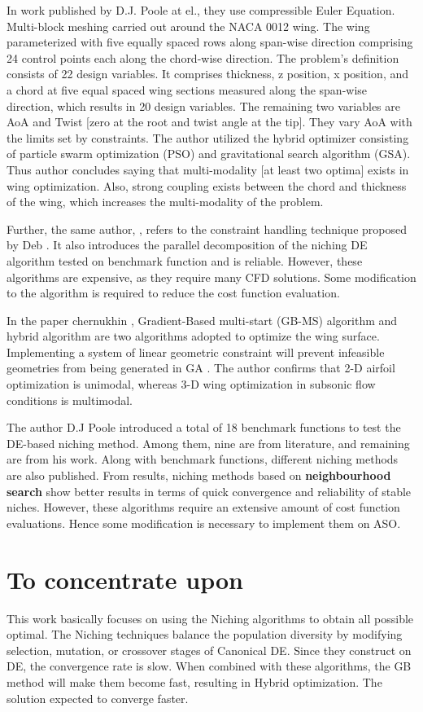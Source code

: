 In work published by D.J. Poole \cite{Poole1} at el., they use compressible Euler Equation. Multi-block meshing carried out around the NACA 0012 wing. The wing parameterized with five equally spaced rows along span-wise direction comprising 24 control points each along the chord-wise direction. The problem's definition consists of 22 design variables. It comprises thickness, z position, x position, and a chord at five equal spaced wing sections measured along the span-wise direction, which results in 20 design variables. The remaining two variables are AoA and Twist [zero at the root and twist angle at the tip]. They vary AoA with the limits set by constraints. The author utilized the hybrid optimizer consisting of particle swarm optimization (PSO) and gravitational search algorithm (GSA). Thus author concludes saying that multi-modality [at least two optima] exists in wing optimization. Also, strong coupling exists between the chord and thickness of the wing, which increases the multi-modality of the problem.

Further, the same author, \cite{Poole2}, refers to the constraint handling technique proposed by Deb \cite{Deb}. It also introduces the parallel decomposition of the niching DE algorithm tested on benchmark function and is reliable. However, these algorithms are expensive, as they require many CFD solutions. Some modification to the algorithm is required to reduce the cost function evaluation.

In the paper chernukhin \cite{oleg}, Gradient-Based multi-start (GB-MS) algorithm and hybrid algorithm are two algorithms adopted to optimize the wing surface. Implementing a system of linear geometric constraint will prevent infeasible geometries from being generated in GA \cite{oleg:phd}. The author confirms that 2-D airfoil optimization is unimodal, whereas 3-D wing optimization in subsonic flow conditions is multimodal. 

The author D.J Poole \cite{Poole3} introduced a total of 18 benchmark functions to test the DE-based niching method. Among them, nine are from literature, and remaining are from his work. Along with benchmark functions, different niching methods are also published. From results, niching methods based on \textbf{neighbourhood search} show better results in terms of quick convergence and reliability of stable niches. However, these algorithms require an extensive amount of cost function evaluations. Hence some modification is necessary to implement them on ASO.

\section{To concentrate upon}
This work basically focuses on using the Niching algorithms to obtain all possible optimal. The Niching techniques balance the population diversity by modifying selection, mutation, or crossover stages of Canonical DE. Since they construct on DE, the convergence rate is slow. When combined with these algorithms, the GB method will make them become fast, resulting in Hybrid optimization. The solution expected to converge faster. 

